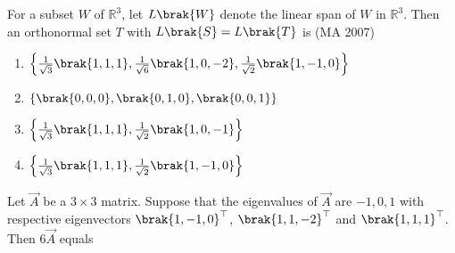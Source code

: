 %
For a subset $W$ of $\mathbb{R}^3$, let $L\brak{W}$ denote the linear span of $W$ in $\mathbb{R}^3$. Then an orthonormal set $T$ with $L\brak{S} = L\brak{T}$ is  \hfill{(MA 2007)}
    \begin{multicols}{2}
\begin{enumerate}    
        \item $\left\{ \frac{1}{\sqrt{3}}\brak{1,1,1}, \frac{1}{\sqrt{6}}\brak{1,0,-2}, \frac{1}{\sqrt{2}}\brak{1,-1,0} \right\}$ 
        \item $\{\brak{0,0,0}, \brak{0,1,0}, \brak{0,0,1}\}$
        \item $\left\{ \frac{1}{\sqrt{3}}\brak{1,1,1}, \frac{1}{\sqrt{2}}\brak{1,0,-1} \right\}$        \item $\left\{ \frac{1}{\sqrt{3}}\brak{1,1,1}, \frac{1}{\sqrt{2}}\brak{1,-1,0} \right\}$
    \end{enumerate}
    \end{multicols}
\item Let $\vec{A}$ be a $3 \times 3$ matrix. Suppose that the eigenvalues of $\vec{A}$ are $-1, 0, 1$ with respective eigenvectors $\brak{1, -1, 0}^\top$, $\brak{1, 1, -2}^\top$ and $\brak{1, 1, 1}^\top$. Then $6\vec{A}$ equals

